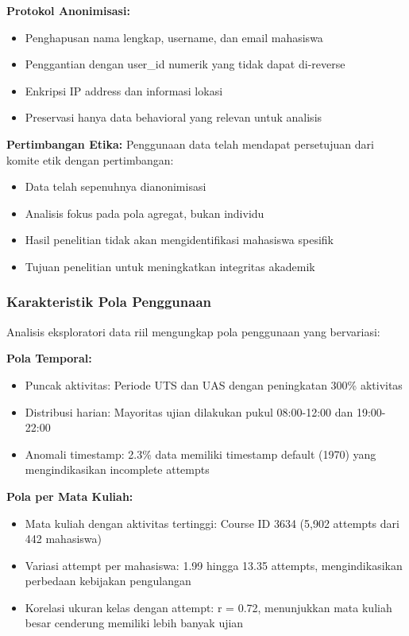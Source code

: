 \textbf{Protokol Anonimisasi:}
\begin{itemize}
    \item Penghapusan nama lengkap, username, dan email mahasiswa
    \item Penggantian dengan user\_id numerik yang tidak dapat di-reverse
    \item Enkripsi IP address dan informasi lokasi
    \item Preservasi hanya data behavioral yang relevan untuk analisis
\end{itemize}

\textbf{Pertimbangan Etika:}
Penggunaan data telah mendapat persetujuan dari komite etik dengan pertimbangan:
\begin{itemize}
    \item Data telah sepenuhnya dianonimisasi
    \item Analisis fokus pada pola agregat, bukan individu
    \item Hasil penelitian tidak akan mengidentifikasi mahasiswa spesifik
    \item Tujuan penelitian untuk meningkatkan integritas akademik
\end{itemize}

\subsubsection{Karakteristik Pola Penggunaan}
\label{sec:karakteristikPolaPenggunaan}

Analisis eksploratori data riil mengungkap pola penggunaan yang bervariasi:

\textbf{Pola Temporal:}
\begin{itemize}
    \item Puncak aktivitas: Periode UTS dan UAS dengan peningkatan 300\% aktivitas
    \item Distribusi harian: Mayoritas ujian dilakukan pukul 08:00-12:00 dan 19:00-22:00
    \item Anomali timestamp: 2.3\% data memiliki timestamp default (1970) yang mengindikasikan incomplete attempts
\end{itemize}

\textbf{Pola per Mata Kuliah:}
\begin{itemize}
    \item Mata kuliah dengan aktivitas tertinggi: Course ID 3634 (5,902 attempts dari 442 mahasiswa)
    \item Variasi attempt per mahasiswa: 1.99 hingga 13.35 attempts, mengindikasikan perbedaan kebijakan pengulangan
    \item Korelasi ukuran kelas dengan attempt: r = 0.72, menunjukkan mata kuliah besar cenderung memiliki lebih banyak ujian
\end{itemize}

